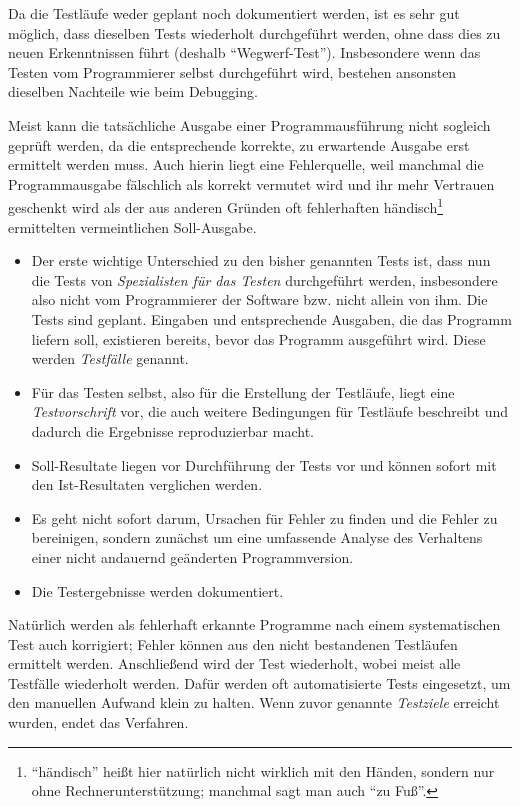 Da die Testläufe weder geplant noch dokumentiert werden, ist es sehr gut möglich, dass dieselben Tests wiederholt durchgeführt werden, ohne dass dies zu neuen Erkenntnissen führt (deshalb "`Wegwerf-Test"'). Insbesondere wenn das Testen vom Programmierer selbst durchgeführt wird, bestehen ansonsten dieselben Nachteile wie beim Debugging.

Meist kann die tatsächliche Ausgabe einer Programmausführung nicht sogleich geprüft werden, da die entsprechende korrekte, zu erwartende Ausgabe erst ermittelt werden muss. Auch hierin liegt eine Fehlerquelle, weil manchmal die Programm\-ausgabe fälschlich als korrekt vermutet wird und ihr mehr Vertrauen geschenkt wird als der aus anderen Gründen oft fehlerhaften händisch\footnote{"`händisch"' heißt hier natürlich nicht wirklich mit den Händen, sondern nur ohne Rechner\-unterstützung; manchmal sagt man auch "`zu Fuß"'.} ermittelten vermeintlichen Soll-Ausgabe. 

\begin{itemize}
	\item Der erste wichtige 
	Unterschied zu den bisher genannten Tests ist, dass nun die Tests von \emph{Spezialisten für das Testen} durchgeführt werden, insbesondere also nicht vom Programmierer der Software bzw. nicht allein von ihm. Die Tests sind geplant. Eingaben und entsprechende Ausgaben, die das Programm liefern soll, existieren bereits, bevor das Programm ausgeführt wird. Diese werden \emph{Testfälle} genannt.

	\item Für das Testen 
	selbst, also für die Erstellung der Testläufe, liegt eine \emph{Test\-vorschrift} vor, die auch weitere Bedingungen für Testläufe beschreibt und dadurch die Ergebnisse reproduzierbar macht. 

	\item Soll-Resultate 
	liegen vor Durchführung der Tests vor und können sofort mit den Ist-Resultaten verglichen werden. 

	\item Es geht nicht 
	sofort darum, Ursachen für Fehler zu finden und die Fehler zu bereinigen, sondern zunächst um eine umfassende Analyse des Verhaltens einer nicht andauernd geänderten Programmversion.

	\item Die Testergebnisse
	werden dokumentiert.
\end{itemize}

Natürlich werden als fehlerhaft erkannte Programme nach einem systematischen Test auch korrigiert; Fehler können aus den nicht bestandenen Testläufen ermittelt werden. Anschließend wird der Test wiederholt, wobei meist alle Testfälle wiederholt werden. Dafür werden oft automatisierte Tests eingesetzt, um den manuellen Aufwand klein zu halten. Wenn zuvor genannte \emph{Testziele}
erreicht wurden, endet das Verfahren.